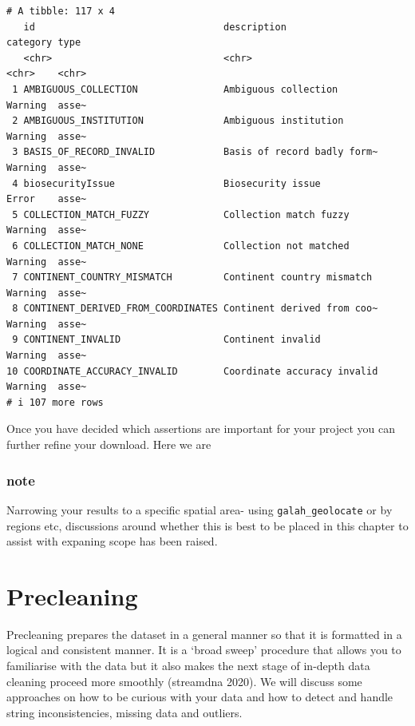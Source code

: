 \documentclass[
  letterpaper,
  DIV=11,
  numbers=noendperiod,
  oneside]{scrreprt}
\begin{document}
\begin{verbatim}
# A tibble: 117 x 4
   id                                 description                 category type 
   <chr>                              <chr>                       <chr>    <chr>
 1 AMBIGUOUS_COLLECTION               Ambiguous collection        Warning  asse~
 2 AMBIGUOUS_INSTITUTION              Ambiguous institution       Warning  asse~
 3 BASIS_OF_RECORD_INVALID            Basis of record badly form~ Warning  asse~
 4 biosecurityIssue                   Biosecurity issue           Error    asse~
 5 COLLECTION_MATCH_FUZZY             Collection match fuzzy      Warning  asse~
 6 COLLECTION_MATCH_NONE              Collection not matched      Warning  asse~
 7 CONTINENT_COUNTRY_MISMATCH         Continent country mismatch  Warning  asse~
 8 CONTINENT_DERIVED_FROM_COORDINATES Continent derived from coo~ Warning  asse~
 9 CONTINENT_INVALID                  Continent invalid           Warning  asse~
10 COORDINATE_ACCURACY_INVALID        Coordinate accuracy invalid Warning  asse~
# i 107 more rows
\end{verbatim}

Once you have decided which assertions are important for your project
you can further refine your download. Here we are

\hypertarget{note}{%
\subsection{note}\label{note}}

Narrowing your results to a specific spatial area- using
\texttt{galah\_geolocate} or by regions etc, discussions around whether
this is best to be placed in this chapter to assist with expaning scope
has been raised.


\hypertarget{precleaning}{%
\chapter{Precleaning}\label{precleaning}}

Precleaning prepares the dataset in a general manner so that it is
formatted in a logical and consistent manner. It is a `broad sweep'
procedure that allows you to familiarise with the data but it also makes
the next stage of in-depth data cleaning proceed more smoothly
(streamdna 2020). We will discuss some approaches on how to be curious
with your data and how to detect and handle string inconsistencies,
missing data and outliers.
\end{document}

